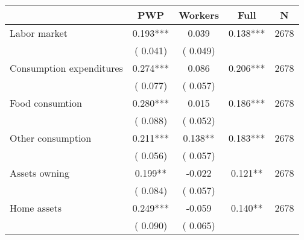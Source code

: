
\begin{tabular}{l*{4}{c}}\hline&\multicolumn{1}{c}{PWP}&\multicolumn{1}{c}{Workers}&\multicolumn{1}{c}{Full}&\multicolumn{1}{c}{N} \\ \hline

 Labor market &              0.193*** &         0.039 &           0.138*** & 2678                       \\  
                 &        (       0.041)                   &        (       0.049)                        &                                                             &                                                      \\      

 Consumption expenditures &              0.274*** &         0.086 &           0.206*** & 2678                       \\  
                 &        (       0.077)                   &        (       0.057)                        &                                                             &                                                      \\      

 Food consumtion &              0.280*** &         0.015 &           0.186*** & 2678                       \\  
                 &        (       0.088)                   &        (       0.052)                        &                                                             &                                                      \\      

 Other consumption &              0.211*** &         0.138** &           0.183*** & 2678                       \\  
                 &        (       0.056)                   &        (       0.057)                        &                                                             &                                                      \\      

 Assets owning &              0.199** &        -0.022 &           0.121** & 2678                       \\  
                 &        (       0.084)                   &        (       0.057)                        &                                                             &                                                      \\      

 Home assets &              0.249*** &        -0.059 &           0.140** & 2678                       \\  
                 &        (       0.090)                   &        (       0.065)                        &                                                             &                                                      \\      


\end{tabular}
